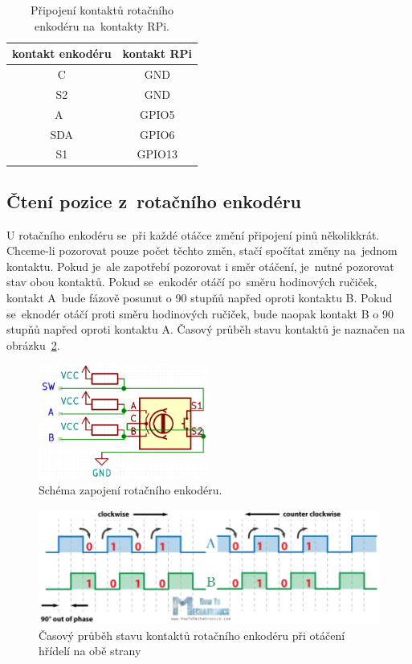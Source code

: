 \begin{table}[htb]
  \centering
  \begin{tabular}{c | c}
    kontakt enkodéru & kontakt RPi \\
    \hline
    C                & GND         \\
    S2               & GND         \\
    A~               & GPIO5       \\
    SDA              & GPIO6       \\
    S1               & GPIO13      \\
  \end{tabular}
  \caption{\label{tab:enc_conn} Připojení kontaktů rotačního enkodéru na~kontakty RPi.}
\end{table}


\subsection{Čtení pozice z~rotačního enkodéru}
U rotačního enkodéru se~při každé otáčce změní připojení pinů několikkrát. Chceme-li pozorovat pouze počet těchto změn, stačí spočítat změny na~jednom kontaktu. Pokud je~ale zapotřebí pozorovat i směr otáčení, je~nutné pozorovat stav obou kontaktů. Pokud se~enkodér otáčí po~směru hodinových ručiček, kontakt A~bude fázově posunut o 90 stupňů napřed oproti kontaktu B.
Pokud se~eknodér otáčí proti směru hodinových ručiček, bude naopak kontakt B o 90 stupňů napřed oproti kontaktu A. Časový průběh stavu kontaktů je naznačen na obrázku~\ref{fig:encoder_data}.
\begin{figure}[htb]
  \centering
  \includegraphics[width=0.5\textwidth]{img/encoder-pinout.jpg}
  \caption{\label{fig:encoder-pinout} Schéma zapojení rotačního enkodéru.}
\end{figure}
\begin{figure}[htb]
  \centering
  \includegraphics[width=1\textwidth]{img/encoder_data.jpg}
  \centering
  \caption{\label{fig:encoder_data} Časový průběh stavu kontaktů rotačního enkodéru při otáčení hřídelí na obě strany}
\end{figure}
